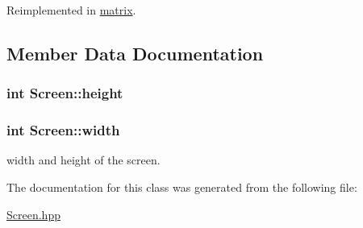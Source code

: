 Reimplemented in \hyperlink{classmatrix_a55827c936f54e69487cc52b83a2311c3}{matrix}.



\subsection{Member Data Documentation}
\subsubsection[{\texorpdfstring{height}{height}}]{\setlength{\rightskip}{0pt plus 5cm}int Screen\+::height\hspace{0.3cm}{\ttfamily [protected]}}\hypertarget{class_screen_a55405920693276db8fbdbf3a903b8d2f}{}\label{class_screen_a55405920693276db8fbdbf3a903b8d2f}
\subsubsection[{\texorpdfstring{width}{width}}]{\setlength{\rightskip}{0pt plus 5cm}int Screen\+::width\hspace{0.3cm}{\ttfamily [protected]}}\hypertarget{class_screen_a49be8f8ccf7ed7a3151a761495c0ce21}{}\label{class_screen_a49be8f8ccf7ed7a3151a761495c0ce21}


width and height of the screen. 



The documentation for this class was generated from the following file\+:\begin{DoxyCompactItemize}
\item 
\hyperlink{_screen_8hpp}{Screen.\+hpp}\end{DoxyCompactItemize}

